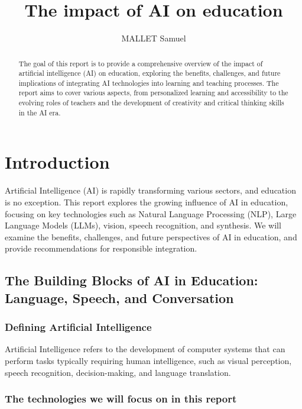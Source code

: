 \documentclass{article}
\title{The impact of AI on education}
\author{MALLET Samuel}
\begin{document}
\maketitle

\begin{abstract}
    The goal of this report is to provide a comprehensive
    overview of the impact of artificial intelligence (AI)
    on education, exploring the benefits, challenges, and
    future implications of integrating AI technologies into
    learning and teaching processes. The report aims to cover
    various aspects, from personalized learning and
    accessibility to the evolving roles of teachers and the
    development of creativity and critical thinking skills
    in the AI era.
\end{abstract}

\newpage

\tableofcontents

\section{Introduction}

Artificial Intelligence (AI) is rapidly transforming various sectors, and education is no exception. This report explores the growing influence of AI in education, focusing on key technologies such as Natural Language Processing (NLP), Large Language Models (LLMs), vision, speech recognition, and synthesis. We will examine the benefits, challenges, and future perspectives of AI in education, and provide recommendations for responsible integration.

\subsection{The Building Blocks of AI in Education: Language, Speech, and Conversation}

\subsubsection{Defining Artificial Intelligence}

Artificial Intelligence refers to the development of computer systems that can perform tasks typically requiring human intelligence, such as visual perception, speech recognition, decision-making, and language translation.

\subsubsection{The technologies we will focus on in this report}
\end{document}
